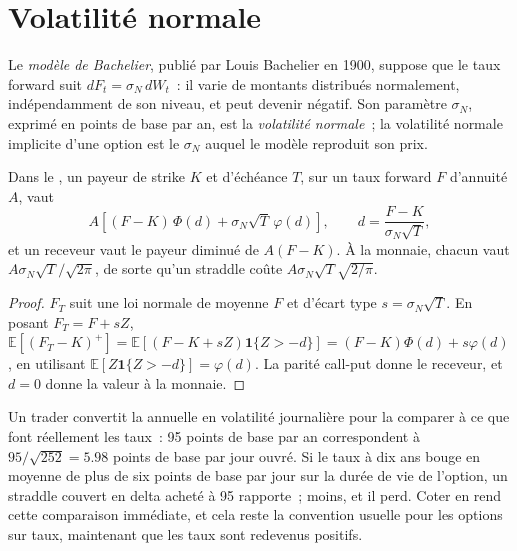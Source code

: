 \section{Volatilité normale}

\begin{definition}\label{def:m2:the-rates-options-market:normal}
Le \emph{modèle de Bachelier}, publié par Louis Bachelier
en 1900, suppose que le taux forward suit $dF_t = \sigma_N\,dW_t$~: il
varie de montants distribués normalement, indépendamment de son niveau, et peut devenir
négatif. Son paramètre $\sigma_N$, exprimé en points de base par an, est la \emph{volatilité
normale}~; la volatilité normale implicite d'une option
est le $\sigma_N$ auquel le modèle reproduit son prix.
\end{definition}

\begin{proposition}\label{prop:m2:the-rates-options-market:bachelier}
Dans le , un payeur de strike $K$ et d'échéance $T$, sur un taux forward
$F$ d'annuité $A$, vaut
\[
A\left[(F-K)\,\Phi(d) + \sigma_N\sqrt{T}\,\varphi(d)\right], \qquad d = \frac{F-K}{\sigma_N\sqrt T},
\]
et un receveur vaut le payeur diminué de $A(F-K)$. À la monnaie, chacun vaut
$A\sigma_N\sqrt{T}/\sqrt{2\pi}$, de sorte qu'un straddle coûte
$A\sigma_N\sqrt{T}\sqrt{2/\pi}$.
\end{proposition}

\begin{proof}
$F_T$ suit une loi normale de moyenne $F$ et d'écart type $s = \sigma_N\sqrt{T}$.
En posant $F_T = F + sZ$, $\mathbb{E}[(F_T-K)^+] = \mathbb{E}[(F-K+sZ)\mathbf 1\{Z>-d\}]
= (F-K)\Phi(d) + s\varphi(d)$, en utilisant $\mathbb{E}[Z\mathbf 1\{Z>-d\}] = \varphi(d)$.
La parité call-put donne le receveur, et $d = 0$ donne la valeur à la monnaie.
\end{proof}

Un trader convertit la  annuelle en volatilité journalière pour la comparer
à ce que font réellement les taux~: 95 points de base par an correspondent à
$95/\sqrt{252} = 5.98$ points de base par jour ouvré. Si le taux à dix ans bouge
en moyenne de plus de six points de base par jour sur la durée de vie de l'option, un
straddle couvert en delta acheté à 95 rapporte~; moins, et il perd. Coter en
 rend cette comparaison immédiate, et cela reste la convention usuelle
pour les options sur taux, maintenant que les taux sont redevenus positifs.

